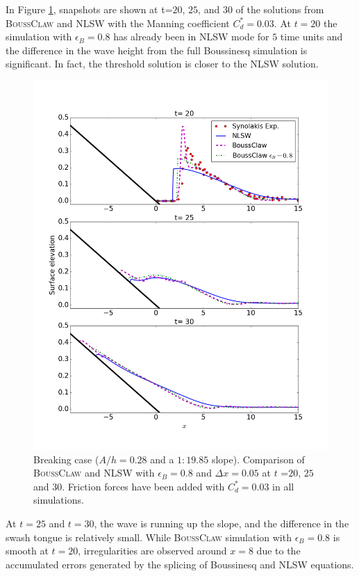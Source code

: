 \documentclass[review]{elsarticle}
\newcommand{\BoussClaw}{\textsc{BoussClaw} }
\begin{document}

In Figure \ref{fig:boussclaw_th08}, snapshots are shown at 
t=$20$, $25$, and $30$ of the solutions from \BoussClaw and NLSW
with the Manning coefficient $C_d^*=0.03$.
At $t=20$ the simulation with $\epsilon_B=0.8$ has already been in NLSW mode for $5$ time units and the difference in the wave height 
from the full Boussinesq simulation is significant. In fact, the threshold solution is closer to the NLSW solution.

\begin{figure}[tbh!]
	\centering
	\includegraphics[width=.75\textwidth]{_fig/bim_boussclaw_etaB8}
	\caption{Breaking case ($A/h=0.28$ and a $1:19.85$ slope).
                 Comparison of \BoussClaw and NLSW 
		with $\epsilon_B=0.8$ and $\Delta x = 0.05$ at $t$ =$20$, $25$ and $30$.
		Friction forces have been added with $C_d^*=0.03$ in all simulations.}
	\label{fig:boussclaw_th08}
\end{figure}

At $t=25$ and $t=30$, the wave is running up the slope, 
and the difference in the swash tongue is relatively small. 
While \BoussClaw simulation with $\epsilon_B=0.8$ is
smooth at $t=20$, irregularities are observed
around $x=8$ due to the accumulated errors generated by the splicing of 
Boussinesq and NLSW equations.%
\end{document}

